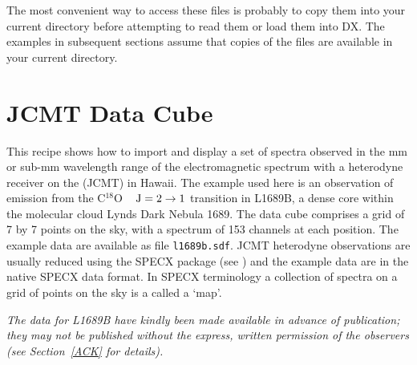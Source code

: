 The most convenient way to access these files is probably to copy them
into your current directory before attempting to read them or load
them into DX.  The examples in subsequent sections assume that copies
of the files are available in your current directory.


\newpage
\section{\label{JCMT}JCMT Data Cube}

This recipe shows how to import and display a set of spectra observed
in the mm or sub-mm wavelength range of the electromagnetic spectrum
with a heterodyne receiver on the  (JCMT) in Hawaii.
The example used here is an observation of emission from the C$^{18}$O ~
${\rm J} = 2 \rightarrow 1$ transition in L1689B, a dense core within
the molecular cloud Lynds Dark Nebula 1689.  The data cube comprises a
grid of 7 by 7 points on the sky, with a spectrum of 153 channels at each
position.  The example data are available as file {\tt l1689b.sdf}.
JCMT heterodyne observations are usually reduced using the SPECX package
(see \cite{SUN17}) and the example data are in the
native SPECX data format.  In SPECX terminology a collection of spectra
on a grid of points on the sky is a called a `map'.

{\it The data for L1689B have kindly been made available in advance of
publication; they may not be published without the express, written
permission of the observers (see Section~\ref{ACK} for details).}

